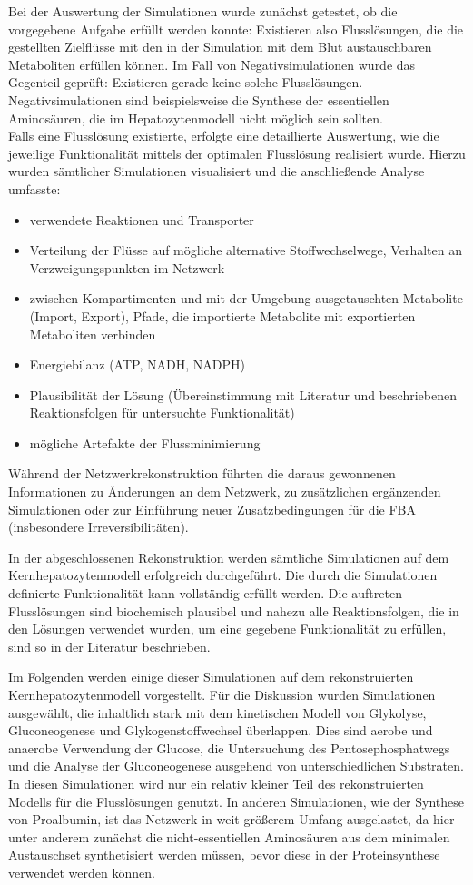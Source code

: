Bei der Auswertung der Simulationen wurde zunächst getestet, ob die vorgegebene Aufgabe erfüllt werden konnte: Existieren also Flusslösungen, die die gestellten Zielflüsse mit den in der Simulation mit dem Blut austauschbaren Metaboliten erfüllen können. Im Fall von Negativsimulationen wurde das Gegenteil geprüft: Existieren gerade keine solche Flusslösungen. Negativsimulationen sind beispielsweise die Synthese der essentiellen Aminosäuren, die im Hepatozytenmodell nicht möglich sein sollten.\\
Falls eine Flusslösung existierte, erfolgte eine detaillierte Auswertung, wie die jeweilige Funktionalität mittels der optimalen Flusslösung realisiert wurde. Hierzu wurden sämtlicher Simulationen visualisiert und die anschließende Analyse umfasste:
\begin{itemize}
 \item verwendete Reaktionen und Transporter
 \item Verteilung der Flüsse auf mögliche alternative Stoffwechselwege, Verhalten an Verzweigungspunkten im Netzwerk
 \item zwischen Kompartimenten und mit der Umgebung ausgetauschten Metabolite (Import, Export), Pfade, die importierte Metabolite mit exportierten Metaboliten verbinden
 \item Energiebilanz (ATP, NADH, NADPH)
 \item Plausibilität der Lösung (Übereinstimmung mit Literatur und beschriebenen Reaktionsfolgen für untersuchte Funktionalität)
 \item mögliche Artefakte der Flussminimierung
\end{itemize}
Während der Netzwerkrekonstruktion führten die daraus gewonnenen Informationen zu Änderungen an dem Netzwerk, zu zusätzlichen ergänzenden Simulationen oder zur Einführung neuer Zusatzbedingungen für die FBA (insbesondere Irreversibilitäten).

In der abgeschlossenen Rekonstruktion werden sämtliche Simulationen auf dem Kernhepatozytenmodell erfolgreich durchgeführt. Die durch die Simulationen definierte Funktionalität kann vollständig erfüllt werden. Die auftreten Flusslösungen sind biochemisch plausibel und nahezu alle Reaktionsfolgen, die in den Lösungen verwendet wurden, um eine gegebene Funktionalität zu erfüllen, sind so in der Literatur beschrieben.

Im Folgenden werden einige dieser Simulationen auf dem rekonstruierten Kernhepatozytenmodell vorgestellt. Für die Diskussion wurden Simulationen ausgewählt, die inhaltlich stark mit dem kinetischen Modell von Glykolyse, Gluconeogenese und Glykogenstoffwechsel überlappen. Dies sind aerobe und anaerobe Verwendung der Glucose, die Untersuchung des Pentosephosphatwegs und die Analyse der Gluconeogenese ausgehend von unterschiedlichen Substraten.\\
In diesen Simulationen wird nur ein relativ kleiner Teil des rekonstruierten Modells für die Flusslösungen genutzt. In anderen Simulationen, wie der Synthese von Proalbumin, ist das Netzwerk in weit größerem Umfang ausgelastet, da hier unter anderem zunächst die nicht-essentiellen Aminosäuren aus dem minimalen Austauschset synthetisiert werden müssen, bevor diese in der Proteinsynthese verwendet werden können.

